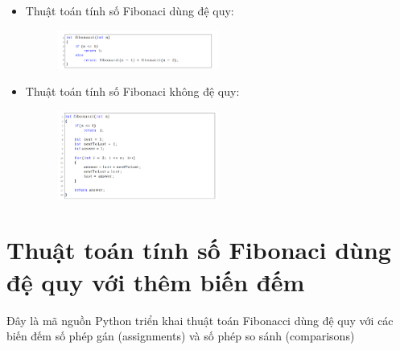 \documentclass[12pt,a4paper]{article}
\begin{document}
\begin{enumerate}[label=\textbf{Câu 2:} ]
\begin{enumerate}[label=\textbf{Câu 3:} ]
\begin{enumerate}[label=\alph*)]
                              \begin{itemize}[label=$\bullet$]
                                  \item Thuật toán tính số Fibonaci dùng đệ quy:
                                        \begin{figure}[h] %
                                            \centering
                                            \includegraphics[width=0.5\textwidth]{img3.png} %
                                            \label{fig:hinh_anh}
                                        \end{figure}
                                    
                                    
                                  \item Thuật toán tính số Fibonaci không đệ quy:
                                        \begin{figure}[h] %
                                            \centering
                                            \includegraphics[width=0.5\textwidth]{img4.png} %
                                            \label{fig:hinh_anh}
                                        \end{figure}
                              \end{itemize}
                              \section*{Thuật toán tính số Fibonaci dùng đệ quy với thêm biến đếm}
                                    Đây là mã nguồn Python triển khai thuật toán Fibonacci dùng đệ quy với các biến đếm số phép gán (assignments) và số phép so sánh (comparisons)\\
                        

\end{enumerate}
\end{enumerate}
\end{enumerate}
\end{document}
